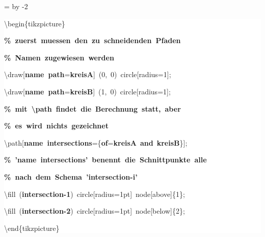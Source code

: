\begingroup
\ttfamily
{}
=\textwidth
\advance{} by -2\fboxsep
\noindent
\colorbox{background}
{%
\parbox{\dimen255}
{%
\rule[-0.5ex]{0pt}{2.5ex}\hspace*{0.0em}\textbackslash{}begin\{tikzpicture\}\\
\rule[-0.5ex]{0pt}{2.5ex}\hspace*{1.0em}\textcolor{G}{\textbf{\%~zuerst~muessen~den~zu~schneidenden~Pfaden}}\\
\rule[-0.5ex]{0pt}{2.5ex}\hspace*{1.0em}\textcolor{G}{\textbf{\%~Namen~zugewiesen~werden}}\\
\rule[-0.5ex]{0pt}{2.5ex}\hspace*{1.0em}\textbackslash{}draw[\textcolor{R}{\textbf{name~path}}=\textcolor{B}{\textbf{kreisA}}]~(0,~0)~circle[radius=1];\\
\rule[-0.5ex]{0pt}{2.5ex}\hspace*{1.0em}\textbackslash{}draw[\textcolor{R}{\textbf{name~path}}=\textcolor{B}{\textbf{kreisB}}]~(1,~0)~circle[radius=1];\\
\rule[-0.5ex]{0pt}{2.5ex}\hspace*{1.0em}\textcolor{G}{\textbf{\%~mit~\textbackslash{}path~findet~die~Berechnung~statt,~aber}}\\
\rule[-0.5ex]{0pt}{2.5ex}\hspace*{1.0em}\textcolor{G}{\textbf{\%~es~wird~nichts~gezeichnet}}\\
\rule[-0.5ex]{0pt}{2.5ex}\hspace*{1.0em}\textbackslash{}path[\textcolor{R}{\textbf{name~intersections}}=\{\textcolor{R}{\textbf{of}}=\textcolor{B}{\textbf{kreisA}}~\textcolor{R}{\textbf{and}}~\textcolor{B}{\textbf{kreisB}}\}];\\
\rule[-0.5ex]{0pt}{2.5ex}\hspace*{1.0em}\textcolor{G}{\textbf{\%~'name~intersections'~benennt~die~Schnittpunkte~alle}}\\
\rule[-0.5ex]{0pt}{2.5ex}\hspace*{1.0em}\textcolor{G}{\textbf{\%~nach~dem~Schema~'intersection{-}i'}}\\
\rule[-0.5ex]{0pt}{2.5ex}\hspace*{1.0em}\textbackslash{}fill~(\textcolor{B}{\textbf{intersection{-}1}})~circle[radius=1pt]~node[above]\{1\};\\
\rule[-0.5ex]{0pt}{2.5ex}\hspace*{1.0em}\textbackslash{}fill~(\textcolor{B}{\textbf{intersection{-}2}})~circle[radius=1pt]~node[below]\{2\};\\
\rule[-0.5ex]{0pt}{2.5ex}\hspace*{0.0em}\textbackslash{}end\{tikzpicture\}}%
}%
\endgroup
